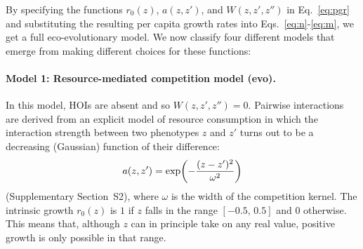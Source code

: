 \documentclass[11pt]{article}
\newcommand{\SI}{Supplementary}
\let\originalleft\left
\let\originalright\right
\renewcommand{\left}{\mathopen{}\mathclose\bgroup\originalleft}
\renewcommand{\right}{\aftergroup\egroup\originalright}
\begin{document}
By specifying the functions $r_0(z)$, $a(z, z')$, and $W(z, z', z'')$ in Eq.~\ref{eq:pgr} and substituting the resulting per capita growth rates into Eqs.~\ref{eq:n}-\ref{eq:m}, we get a full eco-evolutionary model. We now classify four different models that emerge from making different choices for these functions:

\paragraph{Model 1: Resource-mediated competition model (evo).} In this model, HOIs are absent and so $W(z, z', z'') = 0$. Pairwise interactions are derived from an explicit model of resource consumption in which the interaction strength between two phenotypes $z$ and $z'$ turns out to be a decreasing (Gaussian) function of their difference:
\begin{equation}
  \label{eq:evo-kernel}
  a(z,z') = \exp\left( -\frac{(z - z')^2}{\omega^2} \right)
\end{equation}
(\SI{} Section~S2), where $\omega$ is the width of the competition kernel. The intrinsic growth $r_0(z)$ is $1$ if $z$ falls in the range $[-0.5, \, 0.5]$ and $0$ otherwise. This means that, although $z$ can in principle take on any real value, positive growth is only possible in that range.
\end{document}

